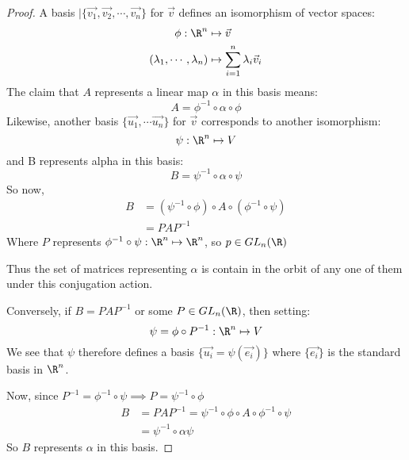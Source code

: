 \documentclass[../Main.tex]{subfiles}
\begin{document}
\begin{proof}
    A basis $|\{\vec{v_1}, \vec{v_2}, \cdots, \vec{v_n}\}$ for $\vec{v}$ defines an isomorphism of vector spaces:
    \begin{align*}
        \phi : \R^n &\mapsto \vec{v} \\
        (\lambda_1, \cdots, \lambda_n) &\mapsto \sum_{i=1}^{n}\lambda_i \vec{v}_i
    \end{align*}
    The claim that $A$ represents a linear map $\alpha$ in this basis means:
    \begin{equation*}
        A = \phi^{-1} \circ \alpha \circ \phi
    \end{equation*}
    Likewise, another basis $\{\vec{u_1}, \cdots \vec{u_n}\}$ for $\vec{v}$ corresponds to another isomorphism:
    \begin{equation*}
        \psi : \R^n \mapsto V
    \end{equation*}
    and B represents alpha in this basis:
    \begin{equation*}
        B = \psi^{-1} \circ \alpha \circ \psi
    \end{equation*}
    So now,
    \begin{align*}
        B &= (\psi^{-1} \circ \phi) \circ A \circ (\phi^{-1} \circ \psi) \\
        &= PAP^{-1}
    \end{align*}
    Where $P$ represents $\phi^{-1} \circ \psi : \R^n \mapsto \R^n$, so $p \in GL_n(\R)$\par
    Thus the set of matrices representing $\alpha$ is contain in the orbit of any one of them under this conjugation action.\par
    Conversely, if $B = PAP^{-1}$ or some $P \in GL_n(\R)$, then setting:
    \begin{equation*}
        \psi = \phi \circ P^{-1} : \R^n \mapsto V
    \end{equation*}
    We see that $\psi$ therefore defines a basis $\{\vec{u_i} = \psi(\vec{e_i})\}$ where $\{\vec{e_i}\}$ is the standard basis in $\R^n$.\par
    Now, since $P^{-1} = \phi^{-1} \circ \psi \implies P = \psi^{-1} \circ \phi$
    \begin{align*}
        B &= PAP^{-1} = \psi^{-1} \circ \phi \circ A \circ \phi^{-1} \circ \psi \\
        &= \psi^{-1} \circ \alpha \psi
    \end{align*}
    So $B$ represents $\alpha$ in this basis.
\end{proof}
\end{document}
